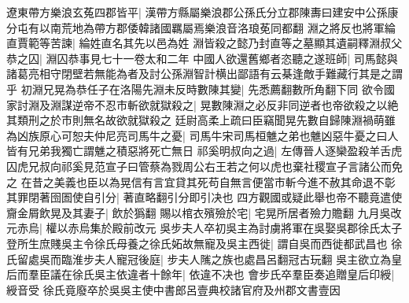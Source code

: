 遼東帶方樂浪玄菟四郡皆平|{
	漢帶方縣屬樂浪郡公孫氏分立郡陳夀曰建安中公孫康分屯有以南荒地為帶方郡倭韓諸國羈屬焉樂浪音洛琅莬同都翻}
淵之將反也將軍綸直賈範等苦諫|{
	綸姓直名其先以邑為姓}
淵皆殺之懿乃封直等之墓顯其遺嗣釋淵叔父恭之囚|{
	淵囚恭事見七十一卷太和二年}
中國人欲還舊鄉者恣聽之遂班師|{
	司馬懿與諸葛亮相守閉壁若無能為者及討公孫淵智計横出鄙語有云棊逢敵手難藏行其是之謂乎}
初淵兄晃為恭任子在洛陽先淵未反時數陳其變|{
	先悉薦翻數所角翻下同}
欲令國家討淵及淵謀逆帝不忍市斬欲就獄殺之|{
	晃數陳淵之必反非同逆者也帝欲殺之以絶其類刑之於市則無名故欲就獄殺之}
廷尉高柔上疏曰臣竊聞晃先數自歸陳淵禍萌雖為凶族原心可恕夫仲尼亮司馬牛之憂|{
	司馬牛宋司馬桓魋之弟也魋凶惡牛憂之曰人皆有兄弟我獨亡謂魋之積惡將死亡無日}
祁奚明叔向之過|{
	左傳晉人逐欒盈殺羊舌虎囚虎兄叔向祁奚見范宣子曰管蔡為戮周公右王若之何以虎也棄社稷宣子言諸公而免之}
在昔之美義也臣以為晃信有言宜貸其死苟自無言便當市斬今進不赦其命退不彰其罪閉著囹圄使自引分|{
	著直略翻引分即引决也}
四方觀國或疑此舉也帝不聽竟遣使齎金屑飲晃及其妻子|{
	飲於㺔翻}
賜以棺衣殯殮於宅|{
	宅晃所居者殮力贍翻}
九月吳改元赤烏|{
	權以赤烏集於殿前改元}
吳步夫人卒初吳主為討虜將軍在吳娶吳郡徐氏太子登所生庶賤吳主令徐氏母養之徐氏妬故無寵及吳主西徙|{
	謂自吳而西徙都武昌也}
徐氏留處吳而臨淮步夫人寵冠後庭|{
	步夫人隲之族也處昌呂翻冠古玩翻}
吳主欲立為皇后而羣臣議在徐氏吳主依違者十餘年|{
	依違不决也}
會步氏卒羣臣奏追贈皇后印綬|{
	綬音受}
徐氏竟廢卒於吳吳主使中書郎呂壹典校諸官府及州郡文書壹因

